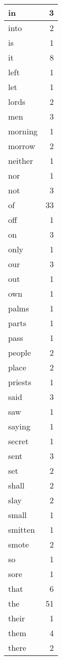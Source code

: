 \begin{center}
\begin{longtable}{l|r}
in & 3 \\ \hline
into & 2 \\ \hline
is & 1 \\ \hline
it & 8 \\ \hline
left & 1 \\ \hline
let & 1 \\ \hline
lords & 2 \\ \hline
men & 3 \\ \hline
morning & 1 \\ \hline
morrow & 2 \\ \hline
neither & 1 \\ \hline
nor & 1 \\ \hline
not & 3 \\ \hline
of & 33 \\ \hline
off & 1 \\ \hline
on & 3 \\ \hline
only & 1 \\ \hline
our & 3 \\ \hline
out & 1 \\ \hline
own & 1 \\ \hline
palms & 1 \\ \hline
parts & 1 \\ \hline
pass & 1 \\ \hline
people & 2 \\ \hline
place & 2 \\ \hline
priests & 1 \\ \hline
said & 3 \\ \hline
saw & 1 \\ \hline
saying & 1 \\ \hline
secret & 1 \\ \hline
sent & 3 \\ \hline
set & 2 \\ \hline
shall & 2 \\ \hline
slay & 2 \\ \hline
small & 1 \\ \hline
smitten & 1 \\ \hline
smote & 2 \\ \hline
so & 1 \\ \hline
sore & 1 \\ \hline
that & 6 \\ \hline
the & 51 \\ \hline
their & 1 \\ \hline
them & 4 \\ \hline
there & 2 \\ \hline

\end{longtable}
\end{center}
